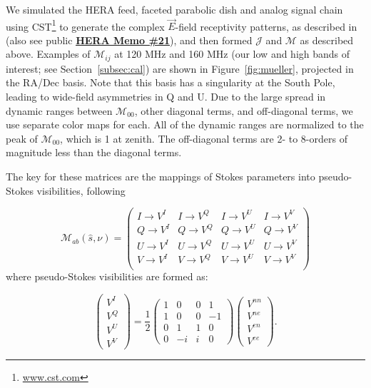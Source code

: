 \documentclass[twocolumn, trackchanges]{aastex61}
\newcommand{\edited}[1]{{\bf \color{red} #1}}
\begin{document}
We simulated the HERA feed, faceted parabolic dish and analog signal chain using CST\footnote{\url{www.cst.com}} to generate the complex $\vec{E}$-field receptivity patterns, as described in \cite{Fagnoni.16} (also see public \href{http://reionization.org/wp-content/uploads/2013/03/HERA_memo_21_CST_simulation_of_HERA_and_comparison_with_measurements.pdf}{\edited{\underline{HERA Memo \#21}}}), and then formed $\mathcal{J}$ and $\mathcal{M}$ as described above. Examples of $\mathcal{M}_{ij}$ at 120 MHz and 160 MHz (our low and high bands of interest; see Section~\ref{subsec:cal}) are shown in Figure~\ref{fig:mueller}, projected in the RA/Dec basis. Note that this basis has a singularity at the South Pole, leading to wide-field asymmetries in Q and U. Due to the large spread in dynamic ranges between $\mathcal{M}_{00}$, other diagonal terms, and off-diagonal terms, we use separate color maps for each. All of the dynamic ranges are normalized to the peak of $\mathcal{M}_{00}$, which  is 1 at zenith. The off-diagonal terms are 2- to 8-orders of magnitude less than the diagonal terms.

The key for these matrices are the mappings of Stokes parameters into pseudo-Stokes visibilities, following

\begin{equation}
\mathcal{M}_{ab}(\hat{s},\nu) =
\begin{pmatrix}
I \rightarrow V^I & I \rightarrow V^Q & I \rightarrow V^U & I \rightarrow V^V\\
Q \rightarrow V^I  & Q \rightarrow V^Q & Q \rightarrow V^U & Q \rightarrow V^V\\
U \rightarrow V^I  & U \rightarrow V^Q & U \rightarrow V^U & U \rightarrow V^V\\
V \rightarrow V^I  & V \rightarrow V^Q & V \rightarrow V^U & V \rightarrow V^V\\
\end{pmatrix}
\label{eq:Mab}
\end{equation}
where pseudo-Stokes visibilities are formed as:

\begin{equation}
\left(\begin{array}{c}
V^{I}\\
V^{Q}\\
V^{U}\\
V^{V}\end{array} \right)
= \frac{1}{2}
\left( \begin{array}{cccc}
1 & 0 & 0 & 1 \\
1 & 0 & 0 & -1 \\
0 & 1 & 1 & 0 \\
0 & -i & i & 0 \end{array} \right) 
\left(\begin{array}{c}
V^{nn}\\
V^{ne}\\
V^{en}\\
V^{ee}\end{array} \right) .
\label{eq:pseudo-stokes}
\end{equation}
\end{document}
